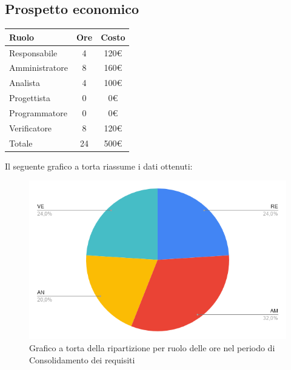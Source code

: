 {{{\subsection{Prospetto economico}\label{PreventivoFaseDiConsolidamentoDeiRequisitiProspettoEconomico}
\quad
\def\tabularxcolumn#1{m{#1}}
{
	\begin{center}
		\renewcommand{\arraystretch}{1.4}
		\begin{tabularx}{7cm}{|X|c|c|}
			\hline
			\rowcolor{airforceblue}
			\textbf{Ruolo} & \textbf{Ore} & \textbf{Costo}\\
			\hline
			Responsabile & 4 & 120\euro\\
			\hline
			Amministratore & 8 & 160\euro\\
			\hline
			Analista & 4 & 100\euro\\
			\hline
			Progettista & 0 & 0\euro\\
			\hline
			Programmatore & 0 & 0\euro\\
			\hline
			Verificatore & 8 & 120\euro\\
			\hline
			Totale & 24 & 500\euro\\
			\hline
		\end{tabularx}
	\end{center}

Il seguente grafico a torta riassume i dati ottenuti:
\begin{figure}[!ht]
	\begin{center}
		\includegraphics[width=0.8\linewidth]{../immagini/pdp/torta_consolidamento_requisiti.png}
		\caption{Grafico a torta della ripartizione per ruolo delle ore nel periodo di Consolidamento
			dei requisiti}
	\end{center}
\end{figure}

}}}}
